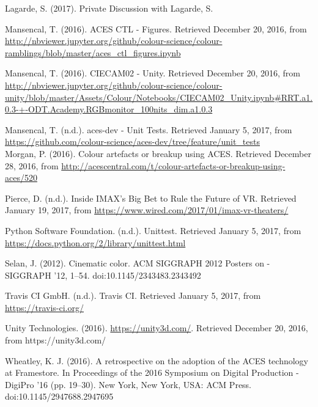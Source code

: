 \documentclass[conference]{IEEEtran}
\begin{document}
\begin{thebibliography}{1}
\renewcommand\@biblabel[1]{[Lag17}
\bibitem{}
Lagarde, S. (2017). Private Discussion with Lagarde, S. \vspace{2mm}

\renewcommand\@biblabel[1]{[MaA16]}
\bibitem{}
Mansencal, T. (2016). ACES CTL - Figures. Retrieved December 20, 2016, from \url{http://nbviewer.jupyter.org/github/colour-science/colour-ramblings/blob/master/aces_ctl_figures.ipynb} \vspace{2mm}

\renewcommand\@biblabel[1]{[MaB16]}
\bibitem{}
Mansencal, T. (2016). CIECAM02 - Unity. Retrieved December 20, 2016, from \url{http://nbviewer.jupyter.org/github/colour-science/colour-unity/blob/master/Assets/Colour/Notebooks/CIECAM02_Unity.ipynb#RRT.a1.0.3-+-ODT.Academy.RGBmonitor_100nits_dim.a1.0.3} \vspace{2mm}

\renewcommand\@biblabel[1]{[Man17]}
\bibitem{}
Mansencal, T. (n.d.). aces-dev - Unit Tests. Retrieved January 5, 2017, from \url{https://github.com/colour-science/aces-dev/tree/feature/unit_tests}\\

\renewcommand\@biblabel[1]{[Mor16]}
\bibitem{}
Morgan, P. (2016). Colour artefacts or breakup using ACES. Retrieved December 28, 2016, from \url{http://acescentral.com/t/colour-artefacts-or-breakup-using-aces/520} \vspace{2mm}

\renewcommand\@biblabel[1]{[Pie20]}
\bibitem{}
Pierce, D. (n.d.). Inside IMAX’s Big Bet to Rule the Future of VR. Retrieved January 19, 2017, from \url{https://www.wired.com/2017/01/imax-vr-theaters/} \vspace{2mm}

\renewcommand\@biblabel[1]{[Pyt17]}
\bibitem{}
Python Software Foundation. (n.d.). Unittest. Retrieved January 5, 2017, from \url{https://docs.python.org/2/library/unittest.html} \vspace{2mm}

\renewcommand\@biblabel[1]{[Sel12]}
\bibitem{}
Selan, J. (2012). Cinematic color. ACM SIGGRAPH 2012 Posters on - SIGGRAPH ’12, 1–54. doi:10.1145/2343483.2343492 \vspace{2mm}

\renewcommand\@biblabel[1]{[Trav17]}
\bibitem{}
Travis CI GmbH. (n.d.). Travis CI. Retrieved January 5, 2017, from \url{https://travis-ci.org/} \vspace{2mm}

\renewcommand\@biblabel[1]{[Uni16]}
\bibitem{}
Unity Technologies. (2016). \url{https://unity3d.com/}. Retrieved December 20, 2016, from {https://unity3d.com/} \vspace{2mm}

\renewcommand\@biblabel[1]{[Whe16]}
\bibitem{}
Wheatley, K. J. (2016). A retrospective on the adoption of the ACES technology at Framestore. In Proceedings of the 2016 Symposium on Digital Production - DigiPro ’16 (pp. 19–30). New York, New York, USA: ACM Press. doi:10.1145/2947688.2947695 \vspace{2mm}

\end{thebibliography}
\end{document}

